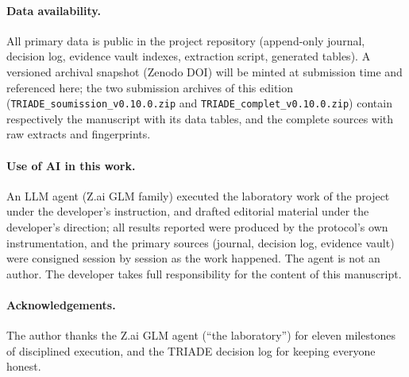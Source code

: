 \documentclass[11pt,a4paper]{article}
\newcommand{\code}[1]{\texttt{\small #1}}
\begin{document}
\paragraph{Data availability.} All primary data is public in the project
repository (append-only journal, decision log, evidence vault indexes,
extraction script, generated tables). A versioned archival snapshot
(Zenodo DOI) will be minted at submission time and referenced here; the
two submission archives of this edition (\code{TRIADE\_soumission\_v0.10.0.zip}
and \code{TRIADE\_complet\_v0.10.0.zip}) contain respectively the
manuscript with its data tables, and the complete sources with raw
extracts and fingerprints.

\paragraph{Use of AI in this work.} An LLM agent (Z.ai GLM family)
executed the laboratory work of the project under the developer's
instruction, and drafted editorial material under the developer's
direction; all results reported were produced by the protocol's own
instrumentation, and the primary sources (journal, decision log,
evidence vault) were consigned session by session as the work happened.
The agent is not an author. The developer takes full responsibility for
the content of this manuscript.

\paragraph{Acknowledgements.} The author thanks the Z.ai GLM agent
(``the laboratory'') for eleven milestones of disciplined execution, and
the TRIADE decision log for keeping everyone honest.


\end{document}
